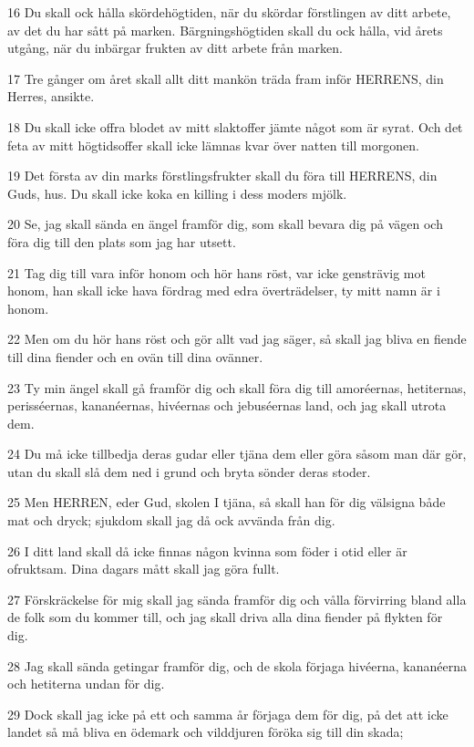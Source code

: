\par 16 Du skall ock hålla skördehögtiden, när du skördar förstlingen av ditt arbete, av det du har sått på marken. Bärgningshögtiden skall du ock hålla, vid årets utgång, när du inbärgar frukten av ditt arbete från marken.
\par 17 Tre gånger om året skall allt ditt mankön träda fram inför HERRENS, din Herres, ansikte.
\par 18 Du skall icke offra blodet av mitt slaktoffer jämte något som är syrat. Och det feta av mitt högtidsoffer skall icke lämnas kvar över natten till morgonen.
\par 19 Det första av din marks förstlingsfrukter skall du föra till HERRENS, din Guds, hus. Du skall icke koka en killing i dess moders mjölk.
\par 20 Se, jag skall sända en ängel framför dig, som skall bevara dig på vägen och föra dig till den plats som jag har utsett.
\par 21 Tag dig till vara inför honom och hör hans röst, var icke gensträvig mot honom, han skall icke hava fördrag med edra överträdelser, ty mitt namn är i honom.
\par 22 Men om du hör hans röst och gör allt vad jag säger, så skall jag bliva en fiende till dina fiender och en ovän till dina ovänner.
\par 23 Ty min ängel skall gå framför dig och skall föra dig till amoréernas, hetiternas, perisséernas, kananéernas, hivéernas och jebuséernas land, och jag skall utrota dem.
\par 24 Du må icke tillbedja deras gudar eller tjäna dem eller göra såsom man där gör, utan du skall slå dem ned i grund och bryta sönder deras stoder.
\par 25 Men HERREN, eder Gud, skolen I tjäna, så skall han för dig välsigna både mat och dryck; sjukdom skall jag då ock avvända från dig.
\par 26 I ditt land skall då icke finnas någon kvinna som föder i otid eller är ofruktsam. Dina dagars mått skall jag göra fullt.
\par 27 Förskräckelse för mig skall jag sända framför dig och vålla förvirring bland alla de folk som du kommer till, och jag skall driva alla dina fiender på flykten för dig.
\par 28 Jag skall sända getingar framför dig, och de skola förjaga hivéerna, kananéerna och hetiterna undan för dig.
\par 29 Dock skall jag icke på ett och samma år förjaga dem för dig, på det att icke landet så må bliva en ödemark och vilddjuren föröka sig till din skada;
